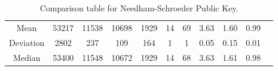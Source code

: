 \begin{table}[!ht]
{{\begin{tabular}{c|ccc|ccc|ccc|c}
        \multicolumn{1}{c|}{Mean}      & 53217                                               & 11538                                   & 10698                                  & 1929    & 14       & 69       & 3.63    & 1.60     & 0.99     & \multicolumn{1}{l}{}                                                                             \\ \cline{1-10}
        \multicolumn{1}{c|}{Deviation} & 2802                                                & 237                                     & 109                                    & 164     & 1        & 1        & 0.05    & 0.15     & 0.01     & \multicolumn{1}{l}{}                                                                             \\ \cline{1-10}
        \multicolumn{1}{c|}{Median}    & 53400                                               & 11548                                   & 10672                                  & 1929    & 14       & 68       & 3.63    & 1.61     & 0.98     & \multicolumn{1}{l}{\parbox[t]{1em}{}}  \\
      \end{tabular}
    }
  }
  \caption{Comparison table for Needham-Schroeder Public Key.}
  \label{tab:NSPK}
\end{table}